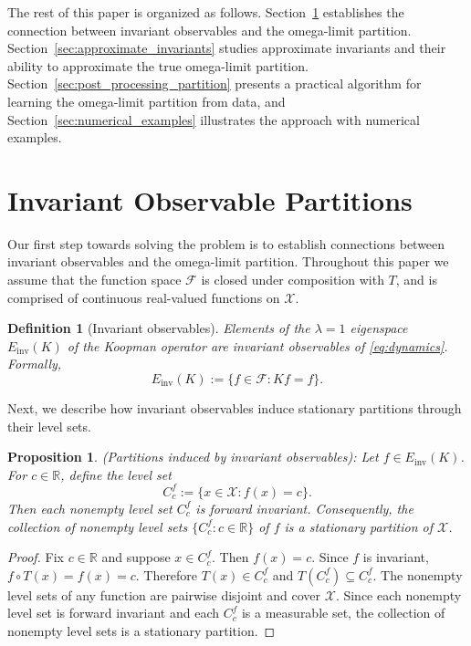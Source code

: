 \documentclass[letterpaper, 10 pt, conference]{ieeeconf}
\newcommand{\Fc}{\mathcal{F}}
\newcommand{\Xc}{\mathcal{X}}
\newcommand{\longthmtitle}[1]{\mbox{}{\textit{(#1):}}}
\def\eqoprocend{\tag*{$\square$}}
\newtheorem{definition}[theorem]{Definition}
\newtheorem{proposition}[theorem]{Proposition}
\newcommand{\R}{\mathbb{R}}
\def\eqoprocend{\tag*{$\bullet$}}
\begin{document}
The rest of this paper is organized as follows. Section~\ref{sec:invariant_observables} establishes the connection between invariant observables and the omega-limit partition. Section~\ref{sec:approximate_invariants} studies approximate invariants and their ability to approximate the true omega-limit partition. Section~\ref{sec:post_processing_partition} presents a practical algorithm for learning the omega-limit partition from data, and Section~\ref{sec:numerical_examples} illustrates the approach with numerical examples.

\section{Invariant Observable Partitions}
\label{sec:invariant_observables}

Our first step towards solving the problem is to establish connections between invariant observables and the omega-limit partition. Throughout this paper we assume that the function space $\Fc$ is closed under composition with $T$, and is comprised of continuous real-valued functions on $\Xc$. 

\begin{definition}[Invariant observables]
Elements of the $\lambda=1$ eigenspace $E_{\text{inv}}(K)$ of the Koopman operator are invariant observables of \eqref{eq:dynamics}. Formally,
\begin{equation*}
    E_{\text{inv}}(K)
    :=
    \{f\in\Fc:Kf=f\}. \eqoprocend
\end{equation*}
\end{definition}
\smallskip

Next, we describe how invariant observables induce stationary partitions through their level sets.

\begin{proposition}\longthmtitle{Partitions induced by invariant observables}
Let $f\in E_{\text{inv}}(K)$. For $c\in\R$, define the level set
\begin{equation}
    C_c^f := \{x\in\Xc:f(x)=c\}.
\end{equation}
Then each nonempty level set $C_c^f$ is forward invariant. Consequently, the collection of nonempty level sets $ \{C_c^f : c \in \R\} $ of $f$ is a stationary partition of $\Xc$.
\end{proposition}

\begin{proof}
Fix $c\in\R$ and suppose $x\in C_c^f$. Then $f(x)=c$. Since $f$ is invariant, $f \circ T (x)=f(x)=c$. Therefore $T(x)\in C_c^f$ and $T(C_c^f)\subseteq C_c^f$. The nonempty level sets of any function are pairwise disjoint and cover $\Xc$. Since each nonempty level set is forward invariant and each $C_c^f$ is a measurable set, the collection of nonempty level sets is a stationary partition. 
\end{proof}
\end{document}
